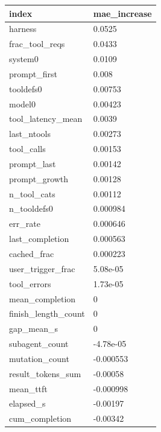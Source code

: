 \begin{tabular}{ll}
\toprule
index & mae\_increase \\
\midrule
harness & 0.0525 \\
frac\_tool\_reqs & 0.0433 \\
system0 & 0.0109 \\
prompt\_first & 0.008 \\
tooldefs0 & 0.00753 \\
model0 & 0.00423 \\
tool\_latency\_mean & 0.0039 \\
last\_ntools & 0.00273 \\
tool\_calls & 0.00153 \\
prompt\_last & 0.00142 \\
prompt\_growth & 0.00128 \\
n\_tool\_cats & 0.00112 \\
n\_tooldefs0 & 0.000984 \\
err\_rate & 0.000646 \\
last\_completion & 0.000563 \\
cached\_frac & 0.000223 \\
user\_trigger\_frac & 5.08e-05 \\
tool\_errors & 1.73e-05 \\
mean\_completion & 0 \\
finish\_length\_count & 0 \\
gap\_mean\_s & 0 \\
subagent\_count & -4.78e-05 \\
mutation\_count & -0.000553 \\
result\_tokens\_sum & -0.00058 \\
mean\_ttft & -0.000998 \\
elapsed\_s & -0.00197 \\
cum\_completion & -0.00342 \\
\bottomrule
\end{tabular}